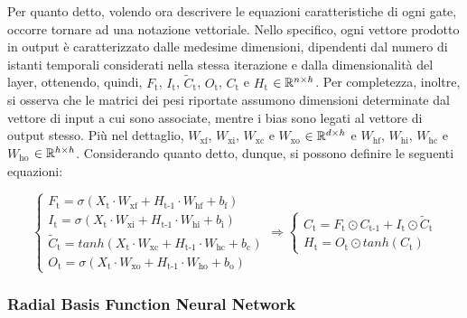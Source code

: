 Per quanto detto, volendo ora descrivere le equazioni caratteristiche di ogni gate, occorre tornare ad una notazione vettoriale. Nello specifico, ogni vettore prodotto in output è caratterizzato dalle medesime dimensioni, dipendenti dal numero di istanti temporali considerati nella stessa iterazione e dalla dimensionalità del layer, ottenendo, quindi, $F_{\text{t}}$, $I_{\text{t}}$, $\tilde{C}_{\text{t}}$, $O_{\text{t}}$, $C_{\text{t}}$ e $H_{\text{t}}$ $\in \mathbb{R}^{n \times h}$. Per completezza, inoltre, si osserva che le matrici dei pesi riportate assumono dimensioni determinate dal vettore di input a cui sono associate, mentre i bias sono legati al vettore di output stesso. Più nel dettaglio, $W_{\text{xf}}$, $W_{\text{xi}}$, $W_{\text{xc}}$ e $W_{\text{xo}}$ $\in \mathbb{R}^{d \times h}$ e $W_{\text{hf}}$, $W_{\text{hi}}$, $W_{\text{hc}}$ e $W_{\text{ho}}$ $\in \mathbb{R}^{h \times h}$. Considerando quanto detto, dunque, si possono definire le seguenti equazioni:

\vspace{-14pt}

    \begin{equation}
        \begin{cases}
            F_{\text{t}} = \sigma \left(X_{\text{t}} \cdot W_{\text{xf}} + H_{\text{t-1}} \cdot W_{\text{hf}} + b_{\text{f}}\right) \\[0.35cm]
            I_{\text{t}} = \sigma \left(X_{\text{t}} \cdot W_{\text{xi}} + H_{\text{t-1}} \cdot W_{\text{hi}} + b_{\text{i}}\right) \\[0.35cm]
            \tilde{C}_{\text{t}} = tanh \left(X_{\text{t}} \cdot W_{\text{xc}} + H_{\text{t-1}} \cdot W_{\text{hc}} + b_{\text{c}}\right) \\[0.35cm]
            O_{\text{t}} = \sigma \left(X_{\text{t}} \cdot W_{\text{xo}} + H_{\text{t-1}} \cdot W_{\text{ho}} + b_{\text{o}}\right)
        \end{cases} \Longrightarrow \begin{cases} C_{\text{t}} = F_{\text{t}} \odot C_{\text{t-1}} + I_{\text{t}} \odot \tilde{C}_{\text{t}} \\[0.35cm]
            H_{\text{t}} = O_{\text{t}} \odot tanh(C_{\text{t}}) \end{cases}
        \label{eq:LSTM}
    \end{equation}


\subsubsection{Radial Basis Function Neural Network}

